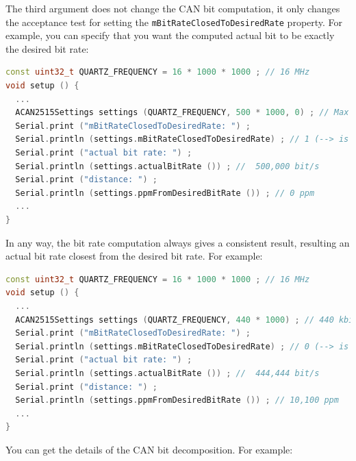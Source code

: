 \documentclass[10pt, a4paper, obeyspaces]{extarticle}
\begin{document}
The third argument does not change the CAN bit computation, it only changes the acceptance test for setting the \texttt{mBitRateClosedToDesiredRate} property. For example, you can specify that you want the computed actual bit to be exactly the desired bit rate:
{ \small\begin{lstlisting}[language=c++]
const uint32_t QUARTZ_FREQUENCY = 16 * 1000 * 1000 ; // 16 MHz
void setup () {
  ...
  ACAN2515Settings settings (QUARTZ_FREQUENCY, 500 * 1000, 0) ; // Max distance is 0 ppm
  Serial.print ("mBitRateClosedToDesiredRate: ") ;
  Serial.println (settings.mBitRateClosedToDesiredRate) ; // 1 (--> is true)
  Serial.print ("actual bit rate: ") ;
  Serial.println (settings.actualBitRate ()) ; //  500,000 bit/s
  Serial.print ("distance: ") ;
  Serial.println (settings.ppmFromDesiredBitRate ()) ; // 0 ppm
  ...
}
\end{lstlisting}}


In any way, the bit rate computation always gives a consistent result, resulting an actual bit rate closest from the desired bit rate. For example:
{ \small\begin{lstlisting}[language=c++]
const uint32_t QUARTZ_FREQUENCY = 16 * 1000 * 1000 ; // 16 MHz
void setup () {
  ...
  ACAN2515Settings settings (QUARTZ_FREQUENCY, 440 * 1000) ; // 440 kbit/s 
  Serial.print ("mBitRateClosedToDesiredRate: ") ;
  Serial.println (settings.mBitRateClosedToDesiredRate) ; // 0 (--> is false)
  Serial.print ("actual bit rate: ") ;
  Serial.println (settings.actualBitRate ()) ; //  444,444 bit/s
  Serial.print ("distance: ") ;
  Serial.println (settings.ppmFromDesiredBitRate ()) ; // 10,100 ppm
  ...
}
\end{lstlisting}}

You can get the details of the CAN bit decomposition. For example:
\end{document}
